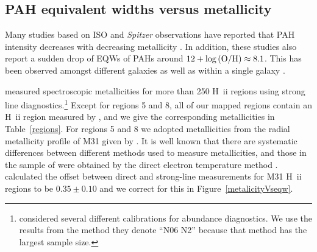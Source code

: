 \subsection{PAH equivalent widths versus metallicity}
\label{sect:eqw_met}

Many studies based on ISO and {\em Spitzer} observations have reported that PAH intensity decreases with decreasing metallicity \citep{Calzetti:2010fk}. 
In addition, these studies also report a sudden drop of EQWs of PAHs around $12+\log{\rm (O/H)} \approx 8.1$. 
This has been observed amongst different galaxies \citep{Engelbracht_2008} as well as within a single galaxy \citep{Gordon:2008lr}. 

\citet{Sanders_2011}  measured spectroscopic metallicities for
more than 250 H~{\sc ii} regions using strong line diagnostics.\footnote{\citet{Sanders_2011} considered several different
calibrations for abundance diagnostics. We use the results from the method they denote ``N06 N2''  \citep{Nagao2006} because
that method has the largest sample size.} Except for regions 5 and 8, all of our mapped regions contain an  H~{\sc ii} region measured by
 \citet{Sanders_2011}, and we give the corresponding metallicities in Table~\ref{regions}.
 For regions 5 and 8 we adopted metallicities from the radial metallicity profile of M31 given by
 \citet{Sanders_2011}. It is well known that there are systematic differences between different 
 methods used to measure metallicities, and those in the sample of \citet{Engelbracht_2008} 
 were obtained by the direct electron temperature method  \citep{Skillman1998}.
\citet{Mitchel2014} calculated the offset between direct and strong-line measurements for M31 H~{\sc ii} regions to be 
$0.35\pm0.10$ and we correct for this in Figure~\ref{metalicityVseqw}.

